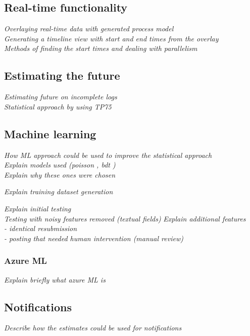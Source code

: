 \documentclass[english,12pt,a4paper,pdftex,sci,utf8]{aaltothesis}
\theoremstyle{definition}
\newcommand{\nyi}[1]{\noindent\colorbox{nyibg}{\textcolor{nyitext}{\emph{#1}}}}
\begin{document}
\subsection{Real-time functionality}

\nyi{Overlaying real-time data with generated process model}\\
\nyi{Generating a timeline view with start and end times from the overlay}\\
\nyi{Methods of finding the start times and dealing with parallelism}

\subsection{Estimating the future}

\nyi{Estimating future on incomplete logs}\\
\nyi{Statistical approach by using TP75}

\subsection{Machine learning}

\nyi{How ML approach could be used to improve the statistical approach}\\
\nyi{Explain models used (poisson \cite{azurepoisson}, bdt \cite{azurebdt} \cite{lambdamart2010})}\\
\nyi{Explain why these ones were chosen}

\nyi{Explain training dataset generation}

\nyi{Explain initial testing}\\
\nyi{Testing with noisy features removed (textual fields)}
\nyi{Explain additional features}\\
\nyi{ - identical resubmission}\\
\nyi{ - posting that needed human intervention (manual review)}

\subsubsection{Azure ML}
\nyi{Explain briefly what azure ML is}

\subsection{Notifications}
\nyi{Describe how the estimates could be used for notifications}
\end{document}
